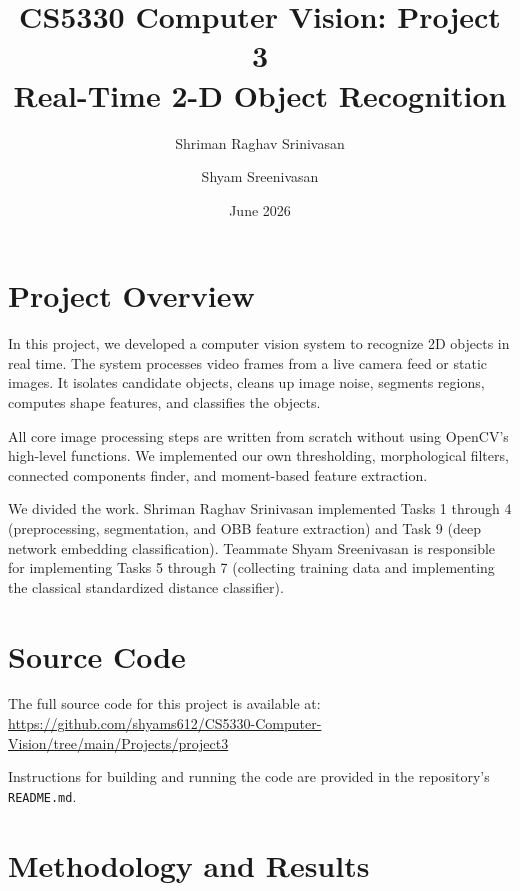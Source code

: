 \documentclass[11pt,letterpaper]{article}
\title{\textbf{CS5330 Computer Vision: Project 3}\\
       \large Real-Time 2-D Object Recognition}
\author{Shriman Raghav Srinivasan \and Shyam Sreenivasan}
\date{June 2026}
\begin{document}
\maketitle

\section*{Project Overview}

In this project, we developed a computer vision system to recognize 2D objects in real time. The system processes video frames from a live camera feed or static images. It isolates candidate objects, cleans up image noise, segments regions, computes shape features, and classifies the objects.

All core image processing steps are written from scratch without using OpenCV's high-level functions. We implemented our own thresholding, morphological filters, connected components finder, and moment-based feature extraction.

We divided the work. Shriman Raghav Srinivasan implemented Tasks 1 through 4 (preprocessing, segmentation, and OBB feature extraction) and Task 9 (deep network embedding classification). Teammate Shyam Sreenivasan is responsible for implementing Tasks 5 through 7 (collecting training data and implementing the classical standardized distance classifier).

\section*{Source Code}

The full source code for this project is available at:\\
\url{https://github.com/shyams612/CS5330-Computer-Vision/tree/main/Projects/project3}

Instructions for building and running the code are provided in the repository's \texttt{README.md}.

\section*{Methodology and Results}
\end{document}
